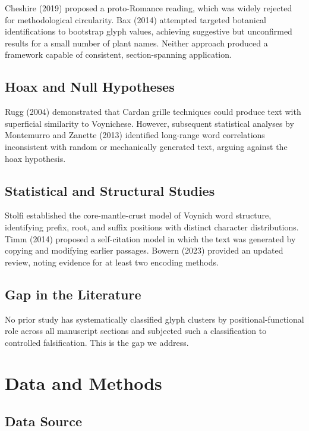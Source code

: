 \documentclass[11pt,a4paper,twocolumn]{article}
\begin{document}
Cheshire (2019) proposed a proto-Romance reading, which was widely rejected for methodological circularity. Bax (2014) attempted targeted botanical identifications to bootstrap glyph values, achieving suggestive but unconfirmed results for a small number of plant names. Neither approach produced a framework capable of consistent, section-spanning application.

\subsection{Hoax and Null Hypotheses}

Rugg (2004) demonstrated that Cardan grille techniques could produce text with superficial similarity to Voynichese. However, subsequent statistical analyses by Montemurro and Zanette (2013) identified long-range word correlations inconsistent with random or mechanically generated text, arguing against the hoax hypothesis.

\subsection{Statistical and Structural Studies}

Stolfi established the core-mantle-crust model of Voynich word structure, identifying prefix, root, and suffix positions with distinct character distributions. Timm (2014) proposed a self-citation model in which the text was generated by copying and modifying earlier passages. Bowern (2023) provided an updated review, noting evidence for at least two encoding methods.

\subsection{Gap in the Literature}

No prior study has systematically classified glyph clusters by positional-functional role across all manuscript sections and subjected such a classification to controlled falsification. This is the gap we address.

\section{Data and Methods}
\label{sec:methods}

\subsection{Data Source}
\end{document}
